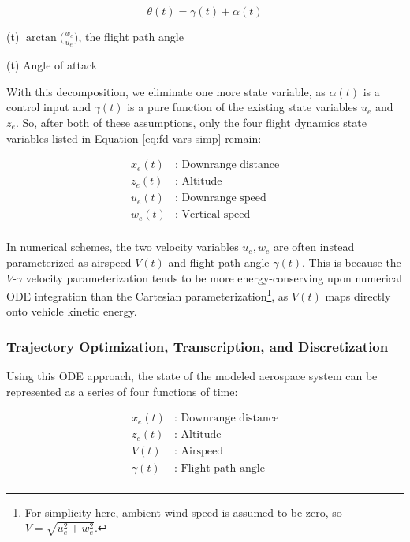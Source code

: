 \begin{equation}
    \theta(t) = \gamma(t) + \alpha(t)
    \label{eq:pitch-split}
\end{equation}

\begin{eqexpl}
    \item{\gamma(t)} $\arctan\big(\frac{w_e}{u_e}\big)$, the flight path angle
    \item{\alpha(t)} Angle of attack
\end{eqexpl}

With this decomposition, we eliminate one more state variable, as $\alpha(t)$ is a control input and $\gamma(t)$ is a pure function of the existing state variables $u_e$ and $z_e$. So, after both of these assumptions, only the four flight dynamics state variables listed in Equation \ref{eq:fd-vars-simp} remain:

\begin{equation}
    \begin{aligned}
        x_e(t)&\text{: Downrange distance}\\
        z_e(t)&\text{: Altitude}\\
        u_e(t)&\text{: Downrange speed}\\
        w_e(t)&\text{: Vertical speed}\\
    \end{aligned}
    \label{eq:fd-vars-simp}
\end{equation}

In numerical schemes, the two velocity variables $u_e, w_e$ are often instead parameterized as airspeed $V(t)$ and flight path angle $\gamma(t)$. This is because the $V$-$\gamma$ velocity parameterization tends to be more energy-conserving upon numerical ODE integration than the Cartesian parameterization\footnote{For simplicity here, ambient wind speed is assumed to be zero, so $V = \sqrt{u_e^2 + w_e^2}$.}, as $V(t)$ maps directly onto vehicle kinetic energy. %

\subsubsection{Trajectory Optimization, Transcription, and Discretization}
\label{sect:dynamics-parameterization}

Using this ODE approach, the state of the modeled aerospace system can be represented as a series of four functions of time:

\begin{equation}
    \begin{aligned}
        x_e(t)&\text{: Downrange distance}\\
        z_e(t)&\text{: Altitude}\\
        V(t)&\text{: Airspeed}\\
        \gamma(t)&\text{: Flight path angle}\\
    \end{aligned}
    \label{eq:fd-vars-subbed}
\end{equation}

